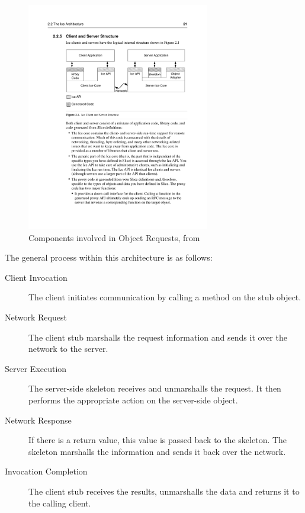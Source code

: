 \documentclass{acm_proc_article-sp}
\begin{document}

\begin{figure}
\centering
\includegraphics[width=8cm]{icefig21.pdf}
\caption{Components involved in Object Requests, from \cite{icemanual}}
\label{fig:icefig21}
\end{figure}

The general process within this architecture is as follows:
\begin{description}
\item[Client Invocation] The client initiates communication by calling a method on the stub object.
\item[Network Request] The client stub marshalls the request information and sends it over the network to the server.
\item[Server Execution] The server-side skeleton receives and unmarshalls the request.  It then performs the appropriate action on the server-side object.
\item[Network Response] If there is a return value, this value is passed back to the skeleton.  The skeleton marshalls the information and sends it back over the network.
\item[Invocation Completion] The client stub receives the results, unmarshalls the data and returns it to the calling client.
\end{description}
\end{document}
